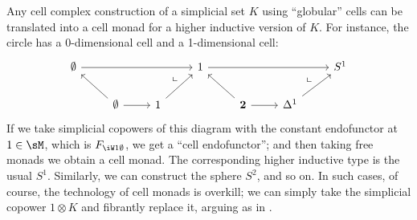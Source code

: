 \documentclass{amsart}
\let\W\iW
\begin{document}
\begin{eg}\label{eg:glob-cx}
  Any cell complex construction of a simplicial set $K$ using ``globular'' cells can be translated into a cell monad for a higher inductive version of $K$.
  For instance, the circle has a 0-dimensional cell and a 1-dimensional cell:
  \[
  \begin{tikzcd}
    \emptyset \ar[rrr] &&& 1 \ar[rrr] &&& S^1 \\
    & \emptyset \ar[ul] \ar[r] \ar[urr,phantom,near end,"\llcorner"] & 1 \ar[ur] &
    & \mathbf{2} \ar[ul] \ar[r] \ar[urr,phantom,near end,"\llcorner"] & \ivl \ar[ur]
  \end{tikzcd}
  \]
  If we take simplicial copowers of this diagram with the constant endofunctor at $1\in \sM$, which is $F_{\W 1 \emptyset}$, we get a ``cell endofunctor''; and then taking free monads we obtain a cell monad.
  The corresponding higher inductive type is the usual $S^1$.
  Similarly, we can construct the sphere $S^2$, and so on.
  In such cases, of course, the technology of cell monads is overkill; we can simply take the simplicial copower $1\otimes K$ and fibrantly replace it, arguing as in .
\end{eg}
\end{document}
